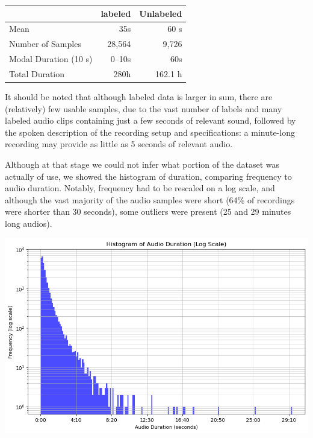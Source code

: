 \documentclass[10pt]{article}
\begin{document}
\begin{table}[h!]
  \centering
  \begin{tabular}{|l|r|r|}
    \hline
    & \textbf{labeled} & \textbf{Unlabeled} \\
    \hline
    Mean                  & 35s      & 60 s       \\
    Number of Samples      & 28,564   & 9,726      \\
    Modal Duration (10 s)  & 0--10s   & 60s        \\
    Total Duration         & 280h     & 162.1 h    \\
    \hline
  \end{tabular}
\end{table}

It should be noted that although labeled data is larger in sum, there are (relatively) few usable samples, due to the vast number of labels and many labeled audio clips containing just a few seconds of relevant sound, followed by the spoken description of the recording setup and specifications: a minute-long recording may provide as little as 5 seconds of relevant audio. 

\begin{minipage}{0.48\linewidth}
Although at that stage we could not infer what portion of the dataset was actually of use, we showed the histogram of duration, comparing frequency to audio duration. Notably, frequency had to be rescaled on a log scale, and although the vast majority of the audio samples were short (64\% of recordings were shorter than 30 seconds), some outliers were present (25 and 29 minutes long audios).
\end{minipage}
\hfill
\begin{minipage}{0.48\linewidth}
  \includegraphics[width=\linewidth]{img/training_duration_histogram.png}
\end{minipage}
\end{document}
